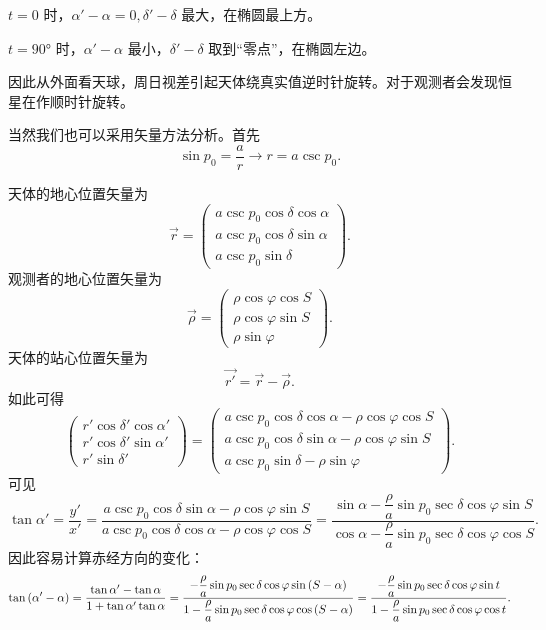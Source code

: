 \documentclass[UTF8, 12pt, a4paper, oneside, onecolumn, fontset=none]{ctexart}
\begin{document}
$t=0$ 时，$\alpha'-\alpha=0,\delta'-\delta$ 最大，在椭圆最上方。

$t=\ang{90;;}$ 时，$\alpha'-\alpha$ 最小，$\delta'-\delta$ 取到“零点”，在椭圆左边。

因此从外面看天球，周日视差引起天体绕真实值逆时针旋转。对于观测者会发现恒星在作顺时针旋转。

当然我们也可以采用矢量方法分析。首先
\begin{equation}
\sin{p_{0}}=\frac{a}{r}\to{}r=a\csc{p_{0}}.
\end{equation}

天体的地心位置矢量为
\begin{equation}
\vec{r}=\begin{pmatrix}
a\csc{p_{0}}\cos{\delta}\cos{\alpha}\\
a\csc{p_{0}}\cos{\delta}\sin{\alpha}\\
a\csc{p_{0}}\sin{\delta}
\end{pmatrix}.
\end{equation}
观测者的地心位置矢量为
\begin{equation}
\vec{\rho}=\begin{pmatrix}
\rho\cos{\varphi}\cos{S}\\
\rho\cos{\varphi}\sin{S}\\
\rho\sin{\varphi}
\end{pmatrix}.
\end{equation}
天体的站心位置矢量为
\begin{equation}
\vec{r'}=\vec{r}-\vec{\rho}.
\end{equation}
如此可得
\begin{equation}
\begin{pmatrix}
r'\cos{\delta'}\cos{\alpha'}\\
r'\cos{\delta'}\sin{\alpha'}\\
r'\sin{\delta'}
\end{pmatrix}=
\begin{pmatrix}
a\csc{p_{0}}\cos{\delta}\cos{\alpha}-\rho\cos{\varphi}\cos{S}\\
a\csc{p_{0}}\cos{\delta}\sin{\alpha}-\rho\cos{\varphi}\sin{S}\\
a\csc{p_{0}}\sin{\delta}-\rho\sin{\varphi}
\end{pmatrix}.
\end{equation}
可见
\begin{equation}
\tan{\alpha'}=\frac{y'}{x'}=\frac{a\csc{p_{0}}\cos{\delta}\sin{\alpha}-\rho\cos{\varphi}\sin{S}}{a\csc{p_{0}}\cos{\delta}\cos{\alpha}-\rho\cos{\varphi}\cos{S}}=\frac{\sin{\alpha}-\dfrac{\rho}{a}\sin{p_{0}}\sec{\delta}\cos{\varphi}\sin{S}}{\cos{\alpha}-\dfrac{\rho}{a}\sin{p_{0}}\sec{\delta}\cos{\varphi}\cos{S}}.
\end{equation}
因此容易计算赤经方向的变化：
\begin{equation}
\tan{\mleft(\alpha'-\alpha\mright)}=\frac{\tan{\alpha'}-\tan{\alpha}}{1+\tan{\alpha'}\tan{\alpha}}=\frac{-\dfrac{\rho}{a}\sin{p_{0}}\sec{\delta}\cos{\varphi}\sin{\mleft(S-\alpha\mright)}}{1-\dfrac{\rho}{a}\sin{p_{0}}\sec{\delta}\cos{\varphi}\cos{\mleft(S-\alpha\mright)}}=\frac{-\dfrac{\rho}{a}\sin{p_{0}}\sec{\delta}\cos{\varphi}\sin{t}}{1-\dfrac{\rho}{a}\sin{p_{0}}\sec{\delta}\cos{\varphi}\cos{t}}.
\end{equation}
\end{document}
